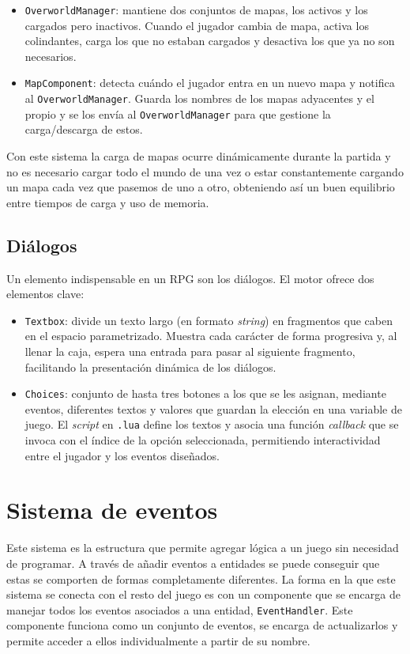 \begin{itemize}
	\item \texttt{OverworldManager}: mantiene dos conjuntos de mapas, los activos y los cargados pero inactivos. Cuando el jugador cambia de mapa, activa los colindantes, carga los que no estaban cargados y desactiva los que ya no son necesarios.
	\item \texttt{MapComponent}: detecta cuándo el jugador entra en un nuevo mapa y notifica al \texttt{OverworldManager}. Guarda los nombres de los mapas adyacentes y el propio y se los envía al \texttt{OverworldManager} para que gestione la carga/descarga de estos.
\end{itemize}

Con este sistema la carga de mapas ocurre dinámicamente durante la partida y no es necesario cargar todo el mundo de una vez o estar constantemente cargando un mapa cada vez que pasemos de uno a otro, obteniendo así un buen equilibrio entre tiempos de carga y uso de memoria. 

\subsection{Diálogos}
Un elemento indispensable en un RPG son los diálogos. El motor ofrece dos elementos clave: 

\begin{itemize}
	\item \texttt{Textbox}: divide un texto largo (en formato \textit{string}) en fragmentos que caben en el espacio parametrizado. Muestra cada carácter de forma progresiva y, al llenar la caja, espera una entrada para pasar al siguiente fragmento, facilitando la presentación dinámica de los diálogos. 
	\item \texttt{Choices}: conjunto de hasta tres botones a los que se les asignan, mediante eventos, diferentes textos y valores que guardan la elección en una variable de juego. El \textit{script} en \texttt{.lua} define los textos y asocia una función \textit{callback} que se invoca con el índice de la opción seleccionada, permitiendo interactividad entre el jugador y los eventos diseñados.
\end{itemize}

\section{Sistema de eventos}
\label{sec:eventos}
Este sistema es la estructura que permite agregar lógica a un juego sin necesidad de programar. A través de añadir eventos a entidades se puede conseguir que estas se comporten de formas completamente diferentes. La forma en la que este sistema se conecta con el resto del juego es con un componente que se encarga de manejar todos los eventos asociados a una entidad, \texttt{EventHandler}. Este componente funciona como un conjunto de eventos, se encarga de actualizarlos y permite acceder a ellos individualmente a partir de su nombre.

